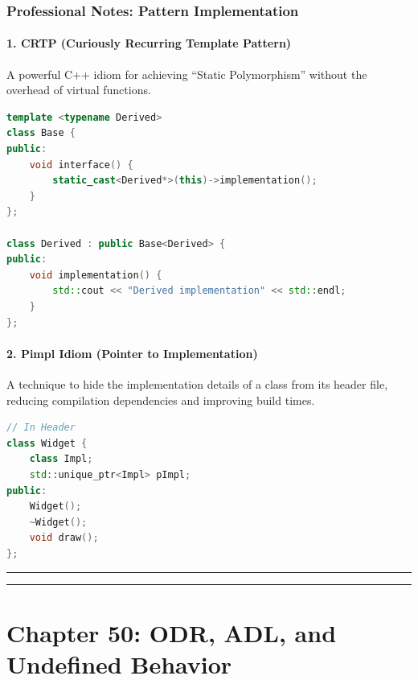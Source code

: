 \hypertarget{professional-notes-pattern-implementation}{%
\subsection{Professional Notes: Pattern
Implementation}\label{professional-notes-pattern-implementation}}

\hypertarget{crtp-curiously-recurring-template-pattern}{%
\subsubsection{1. CRTP (Curiously Recurring Template
Pattern)}\label{crtp-curiously-recurring-template-pattern}}

A powerful C++ idiom for achieving ``Static Polymorphism'' without the
overhead of virtual functions.

\begin{lstlisting}[language={C++}]
template <typename Derived>
class Base {
public:
    void interface() {
        static_cast<Derived*>(this)->implementation();
    }
};

class Derived : public Base<Derived> {
public:
    void implementation() {
        std::cout << "Derived implementation" << std::endl;
    }
};
\end{lstlisting}

\hypertarget{pimpl-idiom-pointer-to-implementation}{%
\subsubsection{2. Pimpl Idiom (Pointer to
Implementation)}\label{pimpl-idiom-pointer-to-implementation}}

A technique to hide the implementation details of a class from its
header file, reducing compilation dependencies and improving build
times.

\begin{lstlisting}[language={C++}]
// In Header
class Widget {
    class Impl;
    std::unique_ptr<Impl> pImpl;
public:
    Widget();
    ~Widget();
    void draw();
};
\end{lstlisting}

\begin{center}\rule{0.5\linewidth}{0.5pt}\end{center}

\begin{center}\rule{0.5\linewidth}{0.5pt}\end{center}

\hypertarget{chapter-50-odr-adl-and-undefined-behavior}{%
\chapter{Chapter 50: ODR, ADL, and Undefined
Behavior}\label{chapter-50-odr-adl-and-undefined-behavior}}

